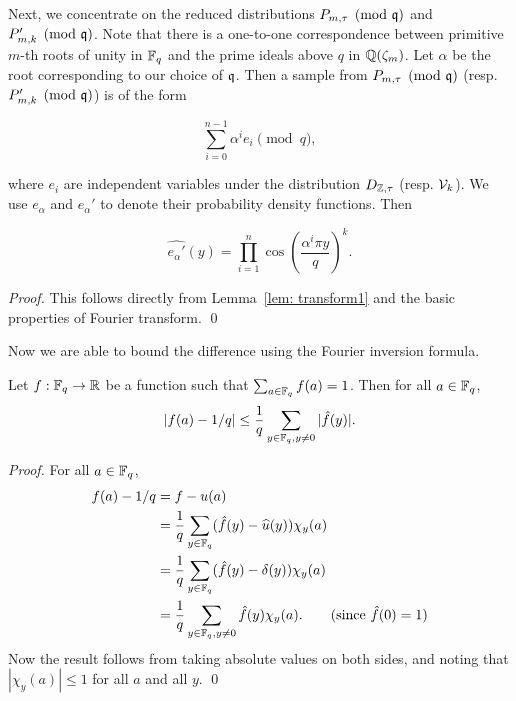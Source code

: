 \documentclass[envcountsame]{llncs}
\begin{document}
Next, we concentrate on the reduced distributions $P_{m,\tau} \pmod{\mathfrak{q}}$ and $P'_{m,k} \pmod {\mathfrak{q}}$. Note that there is a one-to-one correspondence between primitive $m$-th roots of unity in $\mathbb{F}_q$ and the prime ideals above $q$ in $\mathbb{Q}(\zeta_m)$. Let $\alpha$ be the root corresponding to our choice of $\mathfrak{q}$. Then a sample from $P_{m, \tau} \pmod{\mathfrak{q}}$ (resp. $P'_{m,k} \pmod {\mathfrak{q}}$) is
of the form

$$ \sum_{i=0}^{n-1} \alpha^i e_i \pmod {q},$$

where $e_i$ are independent variables under the distribution $D_{\mathbb{Z},\tau}$ (resp. $\mathcal{V}_k$). We use $e_\alpha$ and $e_\alpha'$ to denote their probability density functions. Then

\begin{lemma}
\label{lem: transform2}
\[
    \widehat{e_\alpha'}(y) = \prod_{i=1}^{n} \cos \left(\frac{ \alpha^i \pi y}{q} \right)^k.
\]
\end{lemma}

\begin{proof}
This follows directly from Lemma~\ref{lem: transform1} and the basic properties of Fourier transform.
\qed \end{proof}

Now we are able to bound the difference  using the Fourier inversion formula.

\begin{proposition} \label{prop: bound}
Let $f: \mathbb{F}_q \to \mathbb{R}$ be a function such that $\sum_{a \in \mathbb{F}_q} f(a) = 1$. Then for all $a \in \mathbb{F}_q$,
\begin{equation} \label{eq: secure}
    |f(a) -  1/q| \leq \frac{1}{q}  \sum_{y \in \mathbb{F}_q, y \neq 0}  |\hat{f}(y)|.
\end{equation}
\end{proposition}

\begin{proof} For all $a \in \mathbb{F}_q$,
\begin{align*}
    f(a) - 1/q &= f - u(a) \\
    & = \frac{1}{q} \sum_{y \in \mathbb{F}_q} (\hat{f}(y) - \widehat{u}(y) )\chi_y(a) \\
& = \frac{1}{q} \sum_{y \in \mathbb{F}_q} (\hat{f}(y)  - \delta(y) )\chi_y(a) \\
& = \frac{1}{q} \sum_{y \in \mathbb{F}_q, y \neq 0} \hat{f}(y)  \chi_y(a).  \qquad \mbox{(since $\hat{f}(0) = 1$)}
\end{align*}
Now the result follows from taking absolute values on both sides, and noting that $|\chi_y(a)| \leq 1$ for all $a$ and all $y$.
\qed \end{proof}
\end{document}

